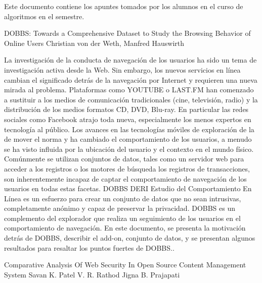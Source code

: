 Este documento contiene los apuntes tomados por los alumnos en el curso de algoritmos en el semestre.



DOBBS: Towards a Comprehensive Dataset to Study the Browsing Behavior of Online Users
Christian von der Weth, Manfred Hauswirth

La investigación de la conducta de navegación de los usuarios ha sido un tema de investigación activa desde la Web. Sin embargo, los nuevos servicios en línea cambian el significado detrás de la navegación por Internet y requieren una nueva mirada al problema. Plataformas como YOUTUBE o LAST.FM han comenzado a sustituir a los medios de comunicación tradicionales (cine, televisión, radio) y la distribución de los medios formatos CD, DVD, Blu-ray. En particular las redes sociales como Facebook atrajo toda nueva, especialmente los menos expertos en tecnología al público. Los avances en las tecnologías móviles de exploración de la de mover el norma y ha cambiado el comportamiento de los usuarios, a menudo se ha visto influida por la ubicación del usuario y el contexto en el mundo físico. Comúnmente se utilizan conjuntos de datos, tales como un servidor web para  acceder a los registros o los motores de búsqueda los registros de transacciones, son inherentemente incapaz de captar el comportamiento de navegación de los usuarios en todas estas facetas. DOBBS DERI Estudio del Comportamiento En Línea es un esfuerzo para crear un conjunto de datos que no sean intrusivas, completamente anónimo y capaz de preservar la privacidad. DOBBS es un complemento del explorador que realiza un seguimiento de los usuarios en el comportamiento de navegación. En este documento, se presenta la motivación detrás de DOBBS, describir el add-on, conjunto de datos, y se presentan algunos resultados para resaltar los puntos fuertes de DOBBS..



Comparative Analysis Of Web Security In Open Source Content Management System
Savan K. Patel
V. R. Rathod
Jigna B. Prajapati

